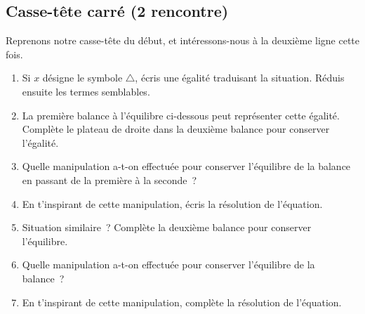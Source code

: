 \documentclass[../math2.tex]{subfiles}
\begin{document}
\newpage
\subsection{Casse-tête carré (2\ieme{} rencontre)}

Reprenons notre casse-tête du début, et intéressons-nous à la deuxième
ligne cette fois.
\begin{center}
  
\end{center}

\begin{enumerate}
  \item
        Si $x$ désigne le symbole $\triangle$, écris une égalité traduisant la
        situation. Réduis ensuite les termes semblables.\vspace*{2cm}
  \item
        La première balance à l'équilibre ci-dessous peut représenter cette
        égalité. Complète le plateau de droite dans la deuxième balance pour
        conserver l'égalité.
        \begin{center}
          \hfil
        \end{center}
  \item
        Quelle manipulation a-t-on effectuée pour conserver l'équilibre de la
        balance en passant de la première à la seconde~?
  \item
        En t'inspirant de cette manipulation, écris la résolution de
        l'équation. \vspace*{3cm}
  \item
        Situation similaire~? Complète la deuxième balance pour conserver
        l'équilibre.
        \begin{center}
          \hfil
        \end{center}
  \item
        Quelle manipulation a-t-on effectuée pour conserver l'équilibre de la
        balance~?
  \item
        En t'inspirant de cette manipulation, complète la résolution de
        l'équation.\vspace*{3cm}
\end{enumerate}
\end{document}
